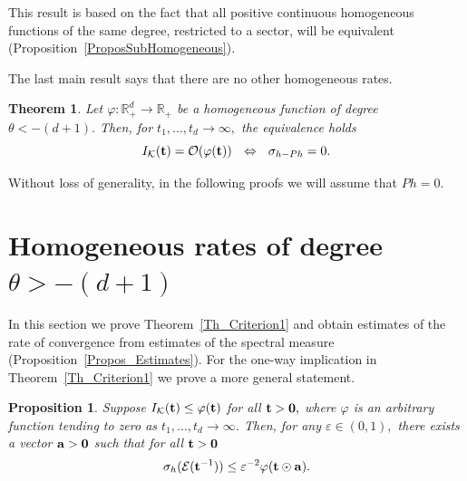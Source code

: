 \documentclass[12pt]{article}
\newtheorem{theorem}{Theorem}
\newtheorem{proposition}{Proposition}
\begin{document}
This result is based on the fact that all positive continuous homogeneous functions of the same degree, restricted to a sector, will be equivalent (Proposition~\ref{ProposSubHomogeneous}).

The last main result says that there are no other homogeneous rates.

\begin{theorem}\label{Th_Criterion3}
	Let ${\varphi:\mathbb{R}^d_+\to\mathbb{R}_+}$ be a homogeneous function of degree ${\theta<-(d+1)}.$ Then, for ${t_1,...,t_d\to\infty},$ the equivalence holds
	$$
	I_{\mathcal{K}}({\bf t})=\mathcal{O}(\varphi({\bf t}))\ \ \Leftrightarrow\ \
	\sigma_{h-Ph}=0.
	$$
\end{theorem}

Without loss of generality, in the following proofs we will assume that ${Ph=0}.$

\section{Homogeneous rates of degree $\theta>-(d+1)$}

In this section we prove Theorem~\ref{Th_Criterion1} and obtain estimates of the rate of convergence from estimates of the spectral measure (Proposition~\ref{Propos_Estimates}). For the one-way implication in Theorem~\ref{Th_Criterion1} we prove a more general statement.

\begin{proposition}\label{Pr1}
Suppose ${I_{\mathcal{K}}({\bf t})\leq\varphi(\bf t)}$ for all ${{\bf t}>\bf 0},$ where $\varphi$ is an arbitrary function tending to zero as ${t_1,...,t_d\to\infty}$. Then, for any ${\varepsilon\in(0,1)},$ there exists a vector ${{\bf a}>\bf0}$ such that for all ${{\bf t}>\bf 0}$ 
$$
{\sigma_h(\mathcal{E}({\bf t}^{-1}))\leq\varepsilon^{-2}\varphi({\bf t}\odot{\bf a})}.
$$ 
\end{proposition}
\end{document}
